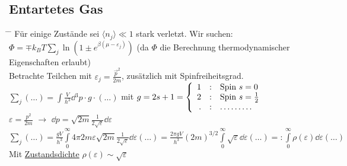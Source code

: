 \subsection{Entartetes Gas}
\begin{tabbing}
\hspace{4em} \= \hspace{4em} \= \kill
Für einige Zustände sei $\langle n_j \rangle \ll 1$ stark verletzt. Wir suchen:\\
$\Phi = \mp k_B T \sum\limits_j \ln \left(1\pm e^{\beta(\mu - \varepsilon_j)}\right)$ (da $\Phi$ die Berechnung thermodynamischer Eigenschaften erlaubt)\\
Betrachte Teilchen mit $\varepsilon_j = \frac{\vec{p}^2}{2 m}$, zusätzlich mit Spinfreiheitsgrad.\\
$\sum\limits_j (\dots) = \int \frac{V}{h^3} \dd{}^3p\cdot g\cdot (\dots )$ mit $g = 2s + 1= \left\{\begin{array}{r@{\quad : \quad} l} 1 & \text{Spin } s=0\\ 2 & \text{Spin } s = \frac{1}{2}\\ . & \dots\dots\dots \end{array}\right.$\\
$\varepsilon = \frac{p^2}{2 m}$ $\rightarrow$ $\dd{p} = \sqrt{2 m}\frac{1}{2\sqrt{\varepsilon}}\dd{\varepsilon}$\\
$\sum\limits_j (\dots) = \frac{g V}{h^3} \int\limits_0^{\infty} 4\pi 2 m \varepsilon \sqrt{2 m}\frac{1}{2 \sqrt{\varepsilon}}\dd{\varepsilon}(\dots) = \frac{2 \pi g V}{h^3} (2 m)^{3/2}\int\limits_0^{\infty}\sqrt{\varepsilon}\dd{\varepsilon}(\dots)=:\int\limits_0^{\infty}\rho(\varepsilon)\dd{\varepsilon}(\dots)$\\
Mit \underline{Zustandsdichte} $\rho(\varepsilon) \sim \sqrt{\varepsilon}$
\end{tabbing}
\begin{figure}[H]
  \centering
\end{figure}
